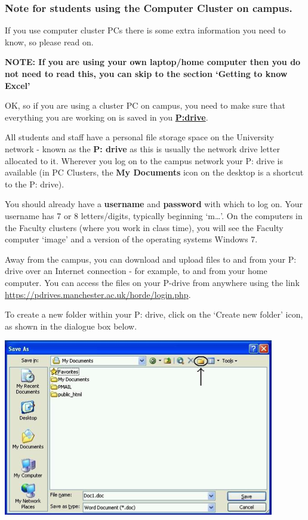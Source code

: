 \documentclass[
]{book}
\begin{document}
\hypertarget{note-for-students-using-the-computer-cluster-on-campus.}{%
\subsubsection{Note for students using the Computer Cluster on campus.}\label{note-for-students-using-the-computer-cluster-on-campus.}}

If you use computer cluster PCs there is some extra information you need to know, so please read on.

\textbf{NOTE: If you are using your own laptop/home computer then you do not need to read this, you can skip to the section `Getting to know Excel'}

OK, so if you are using a cluster PC on campus, you need to make sure that everything you are working on is saved in you \href{https://www.library.manchester.ac.uk/using-the-library/staff/research/research-data-management/working/storage/}{\textbf{P:drive}}.

All students and staff have a personal file storage space on the University network - known as the \textbf{P: drive} as this is usually the network drive letter allocated to it. Wherever you log on to the campus network your P: drive is available (in PC Clusters, the \textbf{My Documents} icon on the desktop is a shortcut to the P: drive).

You should already have a \textbf{username} and \textbf{password} with which to log on. Your username has 7 or 8 letters/digits, typically beginning `m\ldots{}'. On the computers in the Faculty clusters (where you work in class time), you will see the Faculty computer `image' and a version of the operating systems Windows 7.

Away from the campus, you can download and upload files to and from your P: drive over an Internet connection - for example, to and from your home computer. You can access the files on your P-drive from anywhere using the link \url{https://pdrives.manchester.ac.uk/horde/login.php}.

To create a new folder within your P: drive, click on the `Create new folder' icon, as shown in the dialogue box below.

\includegraphics{imgs/create_folder.png}
\end{document}
